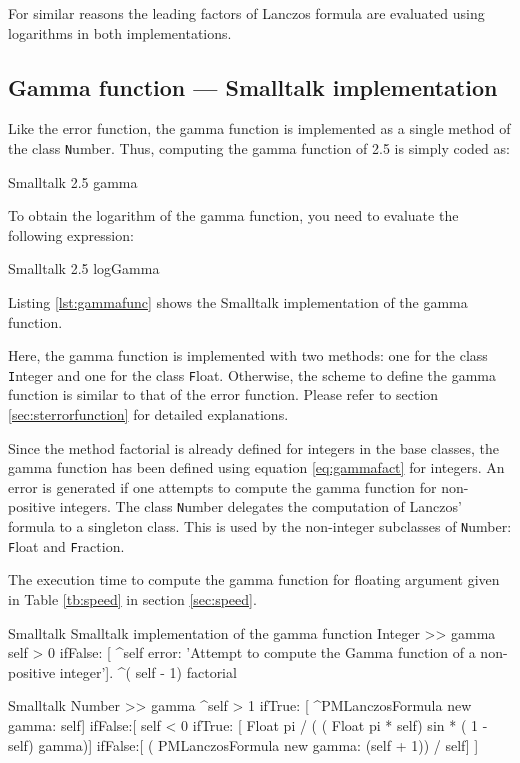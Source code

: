 For similar reasons the leading factors of Lanczos formula are
evaluated using logarithms in both implementations.

\subsection{Gamma function --- Smalltalk implementation}
 Like the error function, the gamma
function is implemented as a single method of the class {\texttt
Number}. Thus, computing the gamma function of 2.5 is simply coded
as:
\begin{displaycode}{Smalltalk}
2.5 gamma
\end{displaycode}
To obtain the logarithm of the gamma function, you need to
evaluate the following expression:
\begin{displaycode}{Smalltalk}
2.5 logGamma
\end{displaycode}

Listing \ref{lst:gammafunc} shows the Smalltalk implementation of the gamma
function.

Here, the gamma function is implemented with two methods: one for
the class {\texttt Integer} and one for the class {\texttt Float}.
Otherwise, the scheme to define the gamma function is similar to
that of the error function. Please refer to section
\ref{sec:sterrorfunction} for detailed explanations.

Since the method factorial is already defined for integers in the
base classes, the gamma function has been defined using equation
\ref{eq:gammafact} for integers. An error is generated if one
attempts to compute the gamma function for non-positive integers.
The class {\texttt Number} delegates the computation of Lanczos'
formula to a singleton class. This is used by the non-integer
subclasses of {\texttt Number}: {\texttt Float} and {\texttt Fraction}.

The execution time to compute the gamma function for floating
argument given in Table \ref{tb:speed} in section \ref{sec:speed}.


\begin{listing}[label=lst:gammafunc]{Smalltalk}
{Smalltalk implementation of the gamma function}
Integer >> gamma
    self > 0
        ifFalse: [ ^self error: 'Attempt to compute the Gamma 
        function of a non-positive integer'].
    ^( self - 1) factorial
\end{listing}

\begin{displaycode}{Smalltalk}
Number >> gamma
    ^self > 1
        ifTrue: [ ^PMLanczosFormula new gamma: self]
        ifFalse:[ self < 0
                     ifTrue: [ Float pi / ( ( Float pi * self) sin * ( 1 - self) gamma)]
                     ifFalse:[ ( PMLanczosFormula new gamma: (self + 1)) / self]
                    ]
\end{displaycode}

